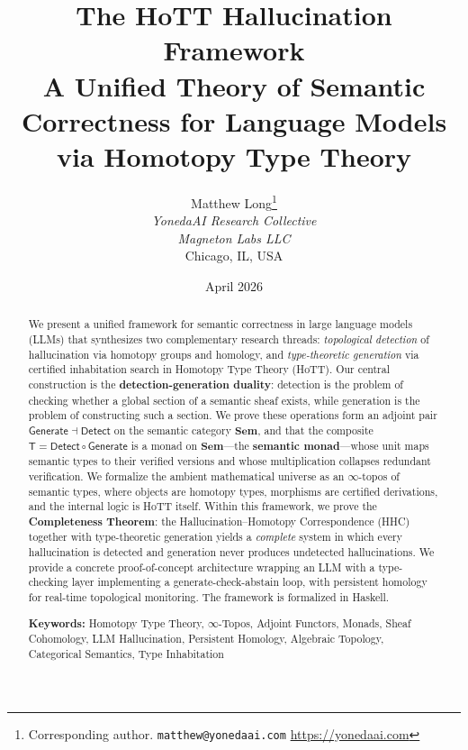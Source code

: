 \documentclass[11pt,a4paper]{article}
\title{%
  \textbf{The HoTT Hallucination Framework}\\[6pt]
  \large A Unified Theory of Semantic Correctness for Language Models\\
  via Homotopy Type Theory%
}
\author{%
  Matthew Long\thanks{%
    Corresponding author. \texttt{matthew@yonedaai.com} \;\textbullet\; \url{https://yonedaai.com}%
  }\\[2pt]
  \textit{YonedaAI Research Collective}\\
  \textit{Magneton Labs LLC}\\
  Chicago, IL, USA
}
\date{April 2026}
\theoremstyle{plain}
\theoremstyle{definition}
\theoremstyle{remark}
\newcommand{\Sem}{\mathbf{Sem}}
\newcommand{\Detect}{\mathsf{Detect}}
\newcommand{\Generate}{\mathsf{Generate}}
\newcommand{\SemanticT}{\mathsf{T}}
\begin{document}
\maketitle
\thispagestyle{empty}

\begin{abstract}
\noindent
We present a unified framework for semantic correctness in large language models (LLMs) that synthesizes two complementary research threads: \emph{topological detection} of hallucination via homotopy groups and homology, and \emph{type-theoretic generation} via certified inhabitation search in Homotopy Type Theory (HoTT). Our central construction is the \textbf{detection-generation duality}: detection is the problem of checking whether a global section of a semantic sheaf exists, while generation is the problem of constructing such a section. We prove these operations form an adjoint pair $\Generate \dashv \Detect$ on the semantic category $\Sem$, and that the composite $\SemanticT = \Detect \circ \Generate$ is a monad on $\Sem$---the \textbf{semantic monad}---whose unit maps semantic types to their verified versions and whose multiplication collapses redundant verification. We formalize the ambient mathematical universe as an $\infty$-topos of semantic types, where objects are homotopy types, morphisms are certified derivations, and the internal logic is HoTT itself. Within this framework, we prove the \textbf{Completeness Theorem}: the Hallucination--Homotopy Correspondence (HHC) together with type-theoretic generation yields a \emph{complete} system in which every hallucination is detected and generation never produces undetected hallucinations. We provide a concrete proof-of-concept architecture wrapping an LLM with a type-checking layer implementing a generate-check-abstain loop, with persistent homology for real-time topological monitoring. The framework is formalized in Haskell.

\medskip
\noindent\textbf{Keywords:} Homotopy Type Theory, $\infty$-Topos, Adjoint Functors, Monads, Sheaf Cohomology, LLM Hallucination, Persistent Homology, Algebraic Topology, Categorical Semantics, Type Inhabitation
\end{abstract}

\tableofcontents
\newpage

\end{document}
